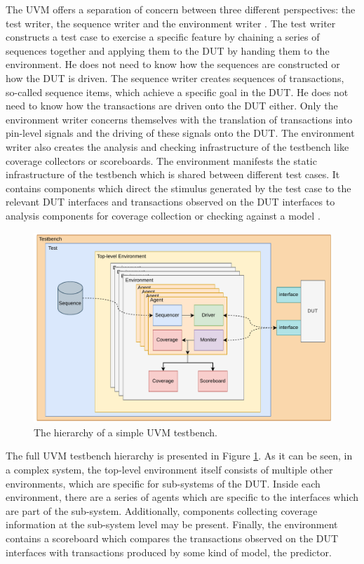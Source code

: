 The UVM offers a separation of concern between three different perspectives: the test writer, the sequence writer and
the environment writer \cite{sutherland2015uvm}. The test writer constructs a test case to exercise a specific
feature by chaining a series of sequences together and applying them to the DUT by handing them to the environment.
He does not need to know how the sequences are constructed or how the DUT is driven. The sequence writer creates
sequences of transactions, so-called sequence items, which achieve a specific goal in the DUT. He does not need to
know how the transactions are
driven onto the DUT either. Only the environment writer concerns themselves with the translation of transactions into
pin-level signals and the driving of these signals onto the DUT. The environment writer also creates the analysis and
checking infrastructure of the testbench like coverage collectors or scoreboards. The environment manifests the
static infrastructure of the testbench which is shared between different test cases. It contains components which
direct the stimulus generated by the test case to the relevant DUT interfaces and transactions observed on the DUT
interfaces to analysis components for coverage
collection or checking against a model \cite{sutherland2015uvm}.

\begin{figure}
  \centering
  \includegraphics[width=\textwidth]{diagrams/uvm_structure.pdf}
  \caption{The hierarchy of a simple UVM testbench.}
  \label{fig:uvm_tb}
\end{figure}

The full UVM testbench hierarchy is presented in Figure \ref{fig:uvm_tb}. As it can be seen, in a complex system, the
top-level environment itself consists of multiple other environments, which are specific for sub-systems of the DUT.
Inside each environment, there are a series of agents which are specific to the interfaces which are part of the
sub-system. Additionally, components collecting coverage information at the sub-system level may be present. Finally,
the environment contains a scoreboard which compares the transactions observed on the DUT interfaces with
transactions produced by some kind of model, the predictor.

